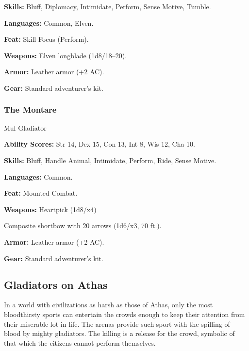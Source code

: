 \textbf{Skills:} Bluff, Diplomacy, Intimidate, Perform, Sense Motive, Tumble.

\textbf{Languages:} Common, Elven.

\textbf{Feat:} Skill Focus (Perform).

\textbf{Weapons:} Elven longblade (1d8/18–20).

\textbf{Armor:} Leather armor (+2 AC).

\textbf{Gear:} Standard adventurer’s kit.

\subsubsection{The Montare}

Mul Gladiator

\textbf{Ability Scores:} Str 14, Dex 15, Con 13, Int 8, Wis 12, Cha 10.

\textbf{Skills:} Bluff, Handle Animal, Intimidate, Perform, Ride, Sense Motive.

\textbf{Languages:} Common.

\textbf{Feat:} Mounted Combat.

\textbf{Weapons:} Heartpick (1d8/x4)

Composite shortbow with 20 arrows (1d6/x3, 70 ft.).

\textbf{Armor:} Leather armor (+2 AC).

\textbf{Gear:} Standard adventurer’s kit.

\subsection{Gladiators on Athas}

In a world with civilizations as harsh as those of Athas, only the most bloodthirsty sports can entertain the crowds enough to keep their attention from their miserable lot in life. The arenas provide such sport with the spilling of blood by mighty gladiators. The killing is a release for the crowd, symbolic of that which the citizens cannot perform themselves.

